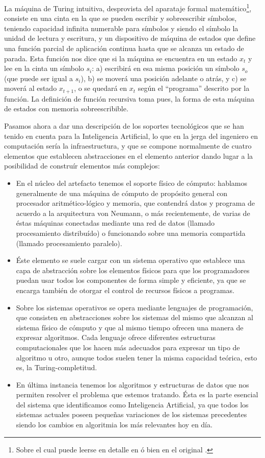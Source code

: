 \documentclass[12pt]{memoir}
\begin{document}
La máquina de Turing intuitiva, desprovista del aparataje formal matemático\footnote{Sobre el cual puede leerse en detalle en \cite{automata} ó bien en el original \cite{turingComputableNumbers}.}, consiste en una cinta en la que se pueden escribir y sobreescribir símbolos, teniendo capacidad infinita numerable para símbolos y siendo el símbolo la unidad de lectura y escritura, y un dispositivo de máquina de estados que define una función parcial de aplicación continua hasta que se alcanza un estado de parada. Esta función nos dice que si la máquina se encuentra en un estado $x_{t}$ y lee en la cinta un símbolo $s_i$: a) escribirá en esa misma posición un símbolo $s_o$ (que puede ser igual a $s_i$), b) se moverá una posición adelante o atrás, y c) se moverá al estado $x_{t+1}$, o se quedará en $x_{t}$ según el ``programa'' descrito por la función. La definición de función recursiva toma pues, la forma de esta máquina de estados con memoria sobreescribible. 

Pasamos ahora a dar una descripción de los soportes tecnológicos que se han tenido en cuenta para la Inteligencia Artificial, lo que en la jerga del ingeniero en computación sería la infraestructura, y que se compone normalmente de cuatro elementos que establecen abstracciones en el elemento anterior dando lugar a la posibilidad de construír elementos más complejos:

\begin{itemize}
	\item En el núcleo del artefacto tenemos el soporte físico de cómputo: hablamos generalmente de una máquina de cómputo de propósito general con procesador aritmético-lógico y memoria, que contendrá datos y programa de acuerdo a la arquitectura von Neumann, o más recientemente, de varias de éstas máquinas conectadas mediante una red de datos (llamado procesamiento distribuído) o funcionando sobre una memoria compartida (llamado procesamiento paralelo).
	\item Éste elemento se suele cargar con un sistema operativo que establece una capa de abstracción sobre los elementos físicos para que los programadores puedan usar todos los componentes de forma simple y eficiente, ya que se encarga también de otorgar el control de recursos físicos a programas.
	\item Sobre los sistemas operativos se opera mediante lenguajes de programación, que consisten en abstracciones sobre los sistemas del mismo que alcanzan al sistema físico de cómputo y que al mismo tiempo ofrecen una manera de expresar algoritmos. Cada lenguaje ofrece diferentes estructuras computacionales que los hacen más adecuados para expresar un tipo de algoritmo u otro, aunque todos suelen tener la misma capacidad teórica, esto es, la Turing-completitud.
	\item En última instancia tenemos los algoritmos y estructuras de datos que nos permiten resolver el problema que estemos tratando. Ésta es la parte esencial del sistema que identificamos como Inteligencia Artificial, ya que todos los sistemas actuales poseen pequeñas variaciones de los sistemas precedentes siendo los cambios en algoritmia los más relevantes hoy en día.
\end{itemize}
\end{document}
